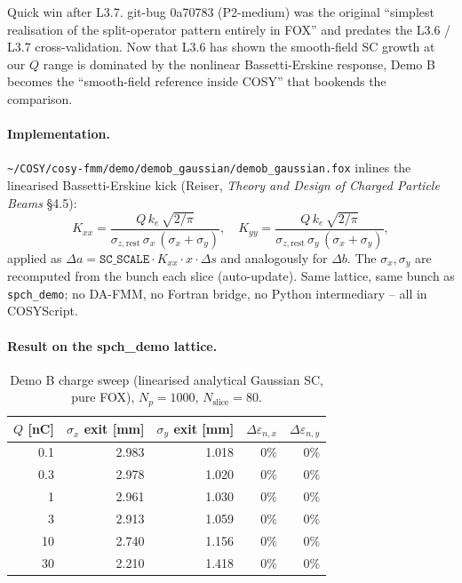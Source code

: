 \documentclass[11pt]{article}
\begin{document}
Quick win after L3.7. git-bug 0a70783 (P2-medium) was the original
``simplest realisation of the split-operator pattern entirely in FOX''
and predates the L3.6 / L3.7 cross-validation. Now that L3.6 has
shown the smooth-field SC growth at our $Q$ range is dominated by
the nonlinear Bassetti-Erskine response, Demo B becomes the
``smooth-field reference inside COSY'' that bookends the comparison.

\paragraph{Implementation.}
\texttt{\textasciitilde/COSY/cosy-fmm/demo/demob\_gaussian/demob\_gaussian.fox}
inlines the linearised Bassetti-Erskine kick (Reiser, \emph{Theory and
Design of Charged Particle Beams} §4.5):
\[
  K_{xx} = \frac{Q\, k_e\, \sqrt{2/\pi}}
                {\sigma_{z,\mathrm{rest}}\, \sigma_x\, (\sigma_x + \sigma_y)}, \quad
  K_{yy} = \frac{Q\, k_e\, \sqrt{2/\pi}}
                {\sigma_{z,\mathrm{rest}}\, \sigma_y\, (\sigma_x + \sigma_y)},
\]
applied as $\Delta a = \texttt{SC\_SCALE} \cdot K_{xx} \cdot x \cdot \Delta s$
and analogously for $\Delta b$. The $\sigma_x, \sigma_y$ are recomputed
from the bunch each slice (auto-update). Same lattice, same bunch as
\texttt{spch\_demo}; no DA-FMM, no Fortran bridge, no Python
intermediary -- all in COSYScript.

\paragraph{Result on the spch\_demo lattice.}

\begin{table}[h]
\caption{Demo B charge sweep (linearised analytical Gaussian SC, pure
FOX), $N_p=1000$, $N_\mathrm{slice}=80$.}
\centering
\begin{tabular}{rrrrr}
\toprule
$Q$ [nC] & $\sigma_x$ exit [mm] & $\sigma_y$ exit [mm]
         & $\Delta\varepsilon_{n,x}$ & $\Delta\varepsilon_{n,y}$ \\
\midrule
 0.1 & 2.983 & 1.018 & $0\%$ & $0\%$ \\
 0.3 & 2.978 & 1.020 & $0\%$ & $0\%$ \\
 1   & 2.961 & 1.030 & $0\%$ & $0\%$ \\
 3   & 2.913 & 1.059 & $0\%$ & $0\%$ \\
10   & 2.740 & 1.156 & $0\%$ & $0\%$ \\
30   & 2.210 & 1.418 & $0\%$ & $0\%$ \\
\bottomrule
\end{tabular}
\end{table}
\end{document}
